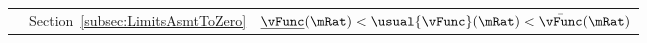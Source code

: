\begin{table}
{\begin{tabular}{|l|l|l|}
    \\                                                                                                                      & Section~\ref{subsec:LimitsAsmtToZero}   & $\underline{\vFunc}(\mRat) < \usual{\vFunc}(\mRat) < \bar{\vFunc}(\mRat)$ %


\end{tabular}}
\end{table}
